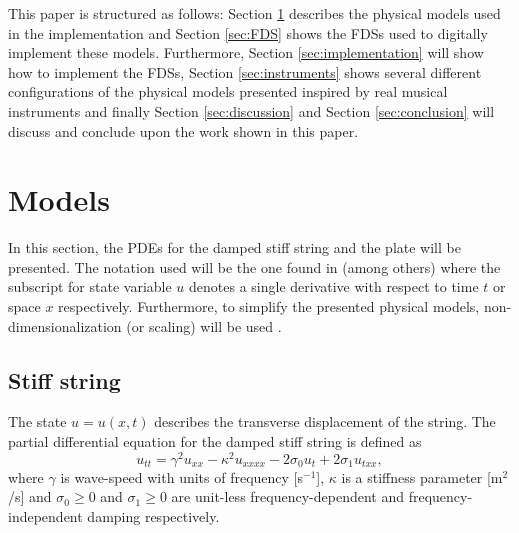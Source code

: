 \documentclass{article}
\begin{document}
This paper is structured as follows: Section \ref{sec:PDE} describes the physical models used in the implementation and Section \ref{sec:FDS} shows the FDSs used to digitally implement these models. Furthermore, Section \ref{sec:implementation} will show how to implement the FDSs, Section \ref{sec:instruments} shows several different configurations of the physical models presented inspired by real musical instruments and finally Section \ref{sec:discussion} and Section \ref{sec:conclusion} will discuss and conclude upon the work shown in this paper.

\section{Models}\label{sec:PDE}
In this section, the PDEs for the damped stiff string and the plate will be presented. The notation used will be the one found in \cite{Bilbao2009:NumericalSoundSynthesis} (among others) where the subscript for state variable $u$ denotes a single derivative with respect to time $t$ or space $x$ respectively. Furthermore, to simplify the presented physical models, non-dimensionalization (or scaling) will be used \cite{Bilbao2009:NumericalSoundSynthesis}. 


\subsection{Stiff string}\label{subsec:stiffStringPDE}
The state $u = u(x,t)$ describes the transverse displacement of the string. The partial differential equation for the damped stiff string is defined as \cite{Bilbao2009:NumericalSoundSynthesis} 
\begin{equation}\label{eq:stiffString}
    u_{tt} = \gamma^2 u_{xx}-\kappa^2u_{xxxx} - 2\sigma_0u_{t} + 2\sigma_1u_{txx},
\end{equation}
where $\gamma$ is wave-speed with units of frequency [s$^{-1}$], $\kappa$ is a stiffness parameter [m$^2$/s]
and $\sigma_0 \geq 0$ and $\sigma_1 \geq 0$ are unit-less frequency-dependent and frequency-independent damping respectively.
\end{document}
